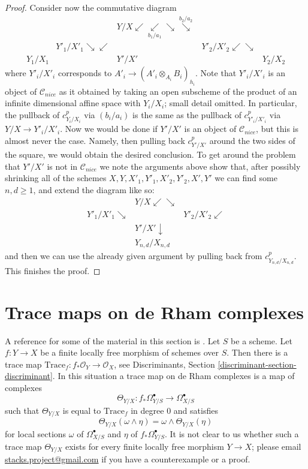 \begin{proof}
Consider now the commutative diagram
$$
\begin{array}{ccccc} &  & Y/X \swarrow\underset{b_1/a_1}{\swarrow}\searrow\overset{b_2/a_2}{\searrow} &  &  \\  & Y'_1/X'_1 \searrow\swarrow &  & Y'_2/X'_2 \swarrow\searrow &  \\ Y_1/X_1 &  & Y'/X' &  & Y_2/X_2\end{array}
$$
where $Y'_i/X'_i$ corresponds to $A'_i \to (A'_i \otimes_{A_i} B_i)_{h_i}$.
Note that $Y'_i/X'_i$ is an object of $\mathcal{C}_{nice}$ as it
obtained by taking an open subscheme of the product of an
infinite dimensional affine space with $Y_i/X_i$; small detail omitted.
In particular, the pullback of $c^p_{Y_i/X_i}$ via $(b_i/a_i)$ is the same
as the pullback of $c^p_{Y'_i/X'_i}$ via $Y/X \to Y'_i/X'_i$.
Now we would be done if $Y'/X'$ is an object of $\mathcal{C}_{nice}$,
but this is almost never the case. Namely, then pulling back $c^p_{Y'/X'}$
around the two sides of the square, we would obtain the desired conclusion.
To get around the problem that $Y'/X'$ is not in $\mathcal{C}_{nice}$
we note the arguments above show that, after possibly shrinking all
of the schemes $X, Y, X'_1, Y'_1, X'_2, Y'_2, X', Y'$ we can find some
$n, d \geq 1$, and extend the diagram like so:
$$
\begin{array}{ccc} & Y/X \swarrow\searrow &  \\ Y'_1/X'_1 \searrow &  & Y'_2/X'_2 \swarrow \\  & Y'/X' \downarrow &  \\  & Y_{n, d}/X_{n, d} & \end{array}
$$
and then we can use the already given argument by pulling
back from $c^p_{Y_{n, d}/X_{n, d}}$. This finishes the proof.
\end{proof}

\section{Trace maps on de Rham complexes}
\label{derham-section-trace}
A reference for some of the material in this section is \cite{Garel}.
Let $S$ be a scheme. Let $f : Y \to X$ be a finite locally free morphism
of schemes over $S$. Then there is a trace map
$\text{Trace}_f : f_*\mathcal{O}_Y \to \mathcal{O}_X$, see
Discriminants, Section \ref{discriminant-section-discriminant}.
In this situation a trace map on de Rham complexes is a map
of complexes
$$
\Theta_{Y/X} : f_*\Omega^\bullet_{Y/S} \longrightarrow \Omega^\bullet_{X/S}
$$
such that $\Theta_{Y/X}$ is equal to $\text{Trace}_f$ in degree $0$
and satisfies
$$
\Theta_{Y/X}(\omega \wedge \eta) = \omega \wedge \Theta_{Y/X}(\eta)
$$
for local sections $\omega$ of $\Omega^\bullet_{X/S}$ and $\eta$
of $f_*\Omega^\bullet_{Y/S}$. It is not clear to us whether such a trace map
$\Theta_{Y/X}$ exists for every finite locally free morphism $Y \to X$;
please email
\href{mailto:stacks.project@gmail.com}{stacks.project@gmail.com}
if you have a counterexample or a proof.

